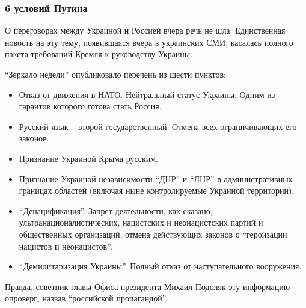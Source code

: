  
 
 
 
 

\subsubsection{6 условий Путина}
\label{sec:11_03_2022.stz.news.ua.strana.1.kiev_v_osade_itogi.5.uslovia}

О переговорах между Украиной и Россией вчера речь не шла. Единственная новость
на эту тему, появившаяся вчера в украинских СМИ, касалась полного пакета
требований Кремля к руководству Украины.

\enquote{Зеркало недели} опубликовало перечень из шести пунктов:

\begin{itemize} %
\item Отказ от движения в НАТО. Нейтральный статус Украины. Одним из гарантов которого готова стать Россия.
    
\item Русский язык – второй государственный. Отмена всех ограничивающих его законов.
    
\item Признание Украиной Крыма русским.
    
\item Признание Украиной независимости \enquote{ДНР} и \enquote{ЛНР} в административных границах областей (включая ныне контролируемые Украиной территории).
    
\item \enquote{Денацификация}. Запрет деятельности, как сказано, ультранационалистических,
нацистских и неонацистских партий и общественных организаций, отмена
действующих законов о \enquote{героизации нацистов и неонацистов}.

\item \enquote{Демилитаризация Украины}. Полный отказ от наступательного вооружения.
\end{itemize} %

Правда, советник главы Офиса президента Михаил Подоляк эту информацию опроверг,
назвав \enquote{российской пропагандой}.

